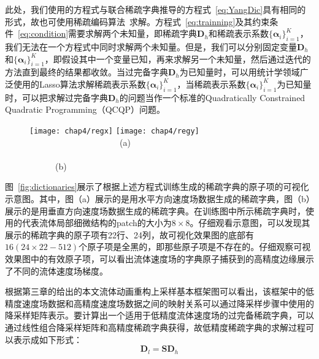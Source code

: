 此处，我们使用的方程式与联合稀疏字典推导的方程式~\ref{eq:YangDic}具有相同的形式，故也可使用稀疏编码算法~\cite{lee2006efficient}求解。方程式~\ref{eq:trainning}及其约束条件~\ref{eq:condition}需要求解两个未知量，即稀疏字典$\boldsymbol D_h$和稀疏表示系数$\{\boldsymbol \alpha_i\}_{i = 1}^K$，我们无法在一个方程式中同时求解两个未知量。但是，我们可以分别固定变量$\boldsymbol D_h$和$\{\boldsymbol \alpha_i\}_{i = 1}^K$，即假设其中一个变量已知，再来求解另一个未知量，然后通过迭代的方法直到最终的结果都收敛。当过完备字典$\boldsymbol D_h$为已知量时，可以用统计学领域广泛使用的Lasso算法求解稀疏表示系数$\{\boldsymbol \alpha_i\}_{i = 1}^K$，当稀疏表示系数$\{\boldsymbol \alpha_i\}_{i = 1}^K$为已知量时，可以把求解过完备字典$\boldsymbol D_h$的问题当作一个标准的Quadratically Constrained
Quadratic Programming（QCQP）问题。

\begin{figure}[ht]
  \centering
  \texttt{[image: chap4/regx]}
  \hspace{0.1cm}
  \texttt{[image: chap4/regy]}
   \newline \ \ \ \ \ \ \ \ \ \ \ \ \ \ \ \ \ \ \ \ \ (a) \ \ \ \ \ \ \ \ \ \ \ \ \ \ \ \ \ \ \ \ \ \ \ \ \ \ \ \ \ \ \ \ \ \ \ \ \ \ \ \ \ \ \ \ \ \ \ \ \ \ \ \ \ \ \ \ \ \ \ \ \ \ \ \ \ \  (b)\ \ \ \ \ \ \ \ \ \ \ \ \ \ \ \ 
\end{figure}

图~\ref{fig:dictionaries}展示了根据上述方程式训练生成的稀疏字典的原子项的可视化示意图。其中，图（a）展示的是用水平方向速度场数据生成的稀疏字典，图（b）展示的是用垂直方向速度场数据生成的稀疏字典。在训练图中所示稀疏字典时，使用的代表流体局部细微结构的patch的大小为$8 \times 8$。仔细观看示意图，可以发现其展示的稀疏字典的原子项有22行、24列，故可视化效果图的底部有$16(24 \times 22 - 512 )$个原子项是全黑的，即那些原子项是不存在的。仔细观察可视效果图中的有效原子项，可以看出流体速度场的字典原子捕获到的高精度边缘展示了不同的流体速度场梯度。

根据第三章的给出的本文流体动画重构上采样基本框架图可以看出，该框架中的低精度速度场数据和高精度速度场数据之间的映射关系可以通过降采样步骤中使用的降采样矩阵表示。要计算出一个适用于低精度流体速度场的过完备稀疏字典，可以通过线性组合降采样矩阵和高精度稀疏字典获得，故低精度稀疏字典的求解过程可以表示成如下形式：
\begin{equation}
\boldsymbol D_l= \boldsymbol {SD}_h
\end{equation}

